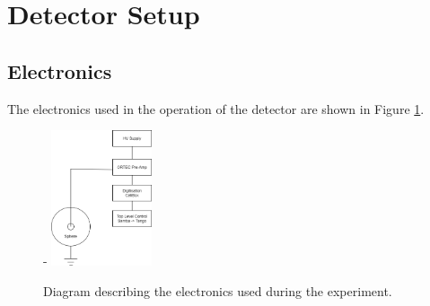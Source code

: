 \documentclass[a4paper]{article}
\begin{document}
\section{Detector Setup}
\subsection{Electronics}
The electronics used in the operation of the detector are shown in Figure \ref{fig:elec}.
\begin{figure}[H]-
    \centering
    \includegraphics[height=4cm]{elec.png}
    \caption{Diagram describing the electronics used during the experiment.}
    \label{fig:elec}
\end{figure}
\end{document}
